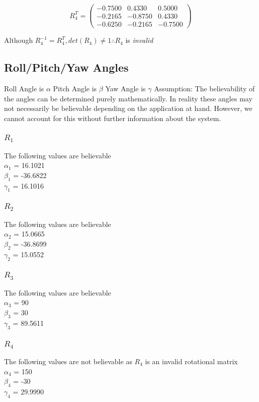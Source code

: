 			$$
			R_{4}^{T} =
			\begin{pmatrix}
				-0.7500 & 0.4330 & 0.5000\\
				-0.2165 & -0.8750 & 0.4330\\
				-0.6250  & -0.2165  & -0.7500
			\end{pmatrix}
			$$
					
			\hspace{30mm}Although $R_{4}^{-1} = R_{4}^{T}, det(R_{4}) \neq 1 \therefore R_{4}$ is \emph{invalid}
					
	\newpage
	\subsection{Roll/Pitch/Yaw Angles}
		Roll Angle is $\alpha$
		Pitch Angle is $\beta$
		Yaw Angle is $\gamma$
	Assumption: The believability of the angles can be determined purely mathematically. In reality these angles may not necessarily be believable depending on the application at hand. However, we cannot account for this without further information about the system.
		\subsubsection{$R_{1}$}
		The following values are believable\\
			$\alpha_{1}$ = 16.1021\degree\\ 
			$\beta_{1}$ = -36.6822\degree\\ 
			$\gamma_{1}$ = 16.1016\degree\\
		\subsubsection{$R_{2}$}
		The following values are believable\\
			$\alpha_{2}$ = 15.0665\degree\\
			$\beta_{2}$ = -36.8699\degree\\
			$\gamma_{2}$ = 15.0552\degree\\
		\subsubsection{$R_{3}$}
		The following values are believable\\
			$\alpha_{3}$ = 90\degree\\
			$\beta_{3}$ = 30\degree\\
			$\gamma_{3}$ = 89.5611\degree\\
		\subsubsection{$R_{4}$}
		The following values are not believable as $R_{4}$ is an invalid rotational matrix\\
			$\alpha_{4}$ = 150\degree\\
			$\beta_{4}$ = -30\degree\\
			$\gamma_{4}$ = 29.9990\degree\\
